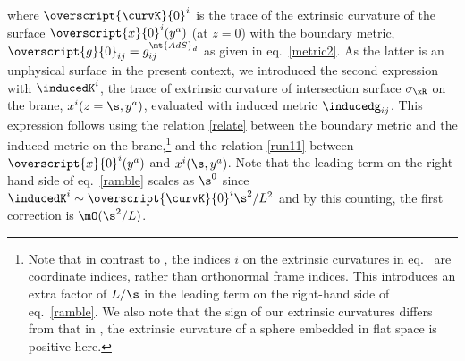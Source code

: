 where $\overscript{\curvK}{0}^i$ is the trace of the extrinsic curvature of the surface $\overscript{x}{0}^i(y^a)$ (at $z=0$) with the boundary metric,  $\overscript{g}{0}_{ij}=g_{ij}^{\mt{AdS}_d}$ as given in eq.~\eqref{metric2}. As the latter is an unphysical surface in the present context, we introduced the second expression with $\inducedK^i$, the trace of extrinsic curvature of intersection surface $\sigma_\xR$ on the brane, \ie $x^i(z=\s,y^a)$, evaluated with induced metric $\inducedg_{ij}$. This expression follows using the relation \eqref{relate} between the boundary metric and the induced metric on the brane,\footnote{Note that in contrast to \cite{Hung:2011ta}, the indices $i$ on the extrinsic curvatures in eq.~ are coordinate indices, rather than orthonormal frame indices. This introduces an extra factor of $L/\s$ in the leading term on the right-hand side of eq.~\eqref{ramble}. We also note that the sign of our extrinsic curvatures differs from that in \cite{Hung:2011ta}, \ie the extrinsic curvature of a sphere embedded in flat space is positive here.} and the relation \eqref{run11} between $\overscript{x}{0}^i(y^a)$ and $x^i(\s,y^a)$. Note that the leading term on the right-hand side of eq.~\eqref{ramble} scales as $\s^0$ since $\inducedK^i\sim \overscript{\curvK}{0}^i \s^2/L^2$ and by this counting, the first correction is $\mO(\s^2/L)$.



